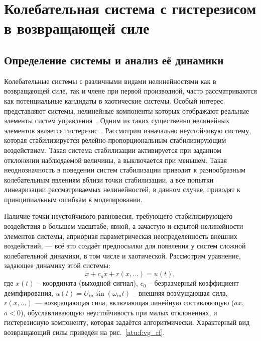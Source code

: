 
\FloatBarrier
\section{Колебательная система с гистерезисом в возвращающей силе} %
\label{atu:sect:vglass}


\subsection{Определение системы и анализ её динамики} %

Колебательные системы с различными видами нелинейностями
как в возвращающей силе, так и члене при первой производной,
часто рассматриваются как потенциальные кандидаты в хаотические системы.
Особый интерес представляют системы, нелинейные компоненты которых
отображают реальные элементы систем управления~\cite{atu_st85,atu_ISDMCI2013,atu_asau20}.
Одним из таких существенно нелинейных элементов
является гистерезис~\cite{sys_hyst,in_theory_mech_vibro,ivanov_alg_id_dyn_hyst,andronn_id_ns_hyst,mai_iss_dyn_isp}.
Рассмотрим изначально неустойчивую  систему,
которая стабилизируется релейно-пропорциональным
стабилизирующим воздействием.
Такая система стабилизации активируется при заданном отклонении наблюдаемой
величины, а выключается при меньшем. Такая неоднозначность в поведении
систем стабилизации приводит к разнообразным колебательным явлениям вблизи
точки стабилизации, а все попытки линеаризации рассматриваемых
нелинейностей, в данном случае, приводят к принципиальным ошибкам в
моделировании.

Наличие точки неустойчивого равновесия, требующего стабилизирующего
воздействия в большем масштабе, явной, а зачастую и скрытой нелинейности
элементов системы, априорная параметрическая неопределенность внешних
воздействий, --- всё это создаёт предпосылки для появления у систем сложной
колебательной динамики, в том числе и хаотической.
Рассмотрим уравнение, задающее динамику этой системы:
%
\begin{equation}
  \ddot{x} + c_o \dot{x} + r( x, \ldots ) = u(t),
  \label{atu:eq:vglass}
\end{equation}
%
где
$x(t)$ -- координата (выходной сигнал),
$ c_0$ -- безразмерный коэффициент демпфирования,
$u(t) = U_{in} \sin( \omega_{in} t ) $ -- внешняя возмущающая сила,
$r( x, \ldots) $ --- возвращающая сила,
включающая линейную составляющую ($ax$, $a<0$),
обуславливающую неустойчивость при малых отклонениях,
и гистерезисную компоненту, которая задаётся алгоритмически.
Характерный вид возвращающий силы приведён на  рис.~\ref{atu:f:vg_rf}.


